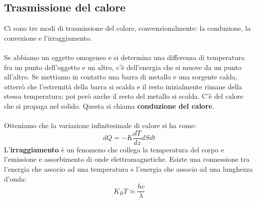 \documentclass{article}
\begin{document}
\subsection{Trasmissione del calore}
Ci sono tre modi di trasmissione del calore, convenzionalmente: la conduzione, la convezione e l’irraggiamento.\\
\\
Se abbiamo un oggetto omogeneo e si determina una differenza di temperatura fra un punto dell’oggetto e un altro, c’è dell’energia che si muove da un punto all’altro. Se mettiamo in contatto una barra di metallo e una sorgente calda, otterrò che l’estremità della barra si scalda e il resto inizialmente rimane della stessa temperatura; poi però anche il resto del metallo si scalda. C’è del calore che si propaga nel solido. Questa si chiama \textbf{conduzione del calore}.\\
\\
Otteniamo che la variazione infinitesimale di calore si ha come:
\[
    dQ = -K\frac{dT}{dz}dS dt
\]
L’\textbf{irraggiamento} è un fenomeno che collega la temperatura del corpo e l’emissione e assorbimento di onde elettromagnetiche. Esiste una connessione tra l’energia che associo ad una temperatura e l’energia che associo ad una lunghezza d’onda:
\[
    K_BT \simeq \frac{hc}{\lambda}
\]
\end{document}

